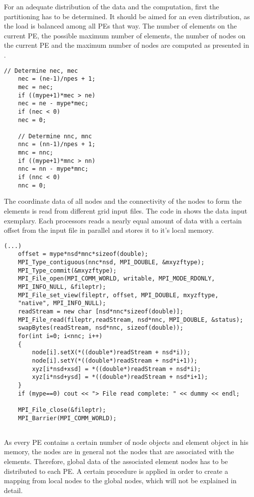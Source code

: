 For an adequate distribution of the data and the computation, first the partitioning has to be determined. It should be aimed for an even distribution, as the load is balanced among all PEs that way. The number of elements on the current PE, the possible maximum number of elements, the number of nodes on the current PE and the maximum number of nodes are computed as presented in .

\begin{lstlisting}[caption={\label{Code:MPI1} Determination of number elements on current rank and number nodes in current}]
	// Determine nec, mec
	nec = (ne-1)/npes + 1;
	mec = nec;
	if ((mype+1)*mec > ne)
	nec = ne - mype*mec;
	if (nec < 0)
	nec = 0;
	
	// Determine nnc, mnc
	nnc = (nn-1)/npes + 1;
	mnc = nnc;
	if ((mype+1)*mnc > nn)
	nnc = nn - mype*mnc;
	if (nnc < 0)
	nnc = 0;
\end{lstlisting}

The coordinate data of all nodes and the connectivity of the nodes to form the elements is read from different grid input files. The code in  shows the data input exemplary. Each processors reads a nearly equal amount of data with a certain offset from the input file in parallel and stores it to it's local memory. 

\begin{lstlisting}[caption={\label{Code:MPI2} Read file for every rank with specific offset}]
	(...)
	offset = mype*nsd*mnc*sizeof(double);
	MPI_Type_contiguous(nnc*nsd, MPI_DOUBLE, &mxyzftype);
	MPI_Type_commit(&mxyzftype);
	MPI_File_open(MPI_COMM_WORLD, writable, MPI_MODE_RDONLY, 
	MPI_INFO_NULL, &fileptr);
	MPI_File_set_view(fileptr, offset, MPI_DOUBLE, mxyzftype, 
	"native", MPI_INFO_NULL);
	readStream = new char [nsd*nnc*sizeof(double)];
	MPI_File_read(fileptr,readStream, nsd*nnc, MPI_DOUBLE, &status);
	swapBytes(readStream, nsd*nnc, sizeof(double));
	for(int i=0; i<nnc; i++)
	{
		node[i].setX(*((double*)readStream + nsd*i));
		node[i].setY(*((double*)readStream + nsd*i+1));
		xyz[i*nsd+xsd] = *((double*)readStream + nsd*i);
		xyz[i*nsd+ysd] = *((double*)readStream + nsd*i+1);
	}
	if (mype==0) cout << "> File read complete: " << dummy << endl;
	
	MPI_File_close(&fileptr);
	MPI_Barrier(MPI_COMM_WORLD);
	
\end{lstlisting}

As every PE contains a certain number of node objects and element object in his memory, the nodes are in general not the nodes that are associated with the elements. Therefore, global data of the associated element nodes has to be distributed to each PE. A certain procedure is applied in order to create a mapping from local nodes to the global nodes, which will not be explained in detail.

